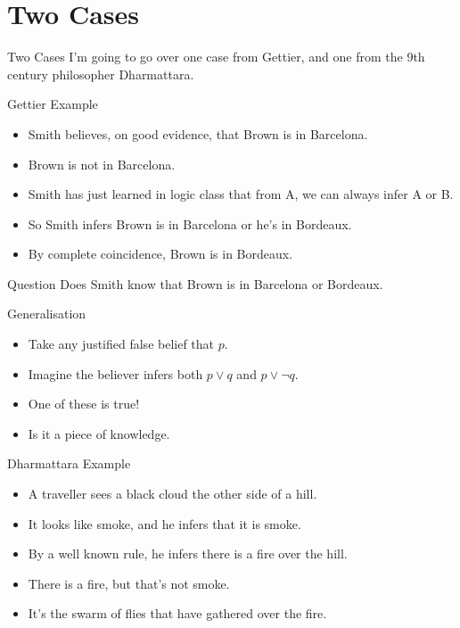 \documentclass[
  17pt,
  letterpaper,
  ignorenonframetext,
  aspectratio=169,
]{beamer}
\providecommand{\tightlist}{%
  \setlength{\itemsep}{0pt}\setlength{\parskip}{0pt}}\usepackage{longtable,booktabs,array}
\begin{document}
\hypertarget{two-cases}{%
\section{Two Cases}\label{two-cases}}

\begin{frame}{Two Cases}
\protect\hypertarget{two-cases-1}{}
I'm going to go over one case from Gettier, and one from the 9th century
philosopher Dharmattara.
\end{frame}

\begin{frame}{Gettier Example}
\protect\hypertarget{gettier-example}{}
\begin{itemize}[<+->]
\tightlist
\item
  Smith believes, on good evidence, that Brown is in Barcelona.
\item
  Brown is not in Barcelona.
\item
  Smith has just learned in logic class that from A, we can always infer
  A or B.
\item
  So Smith infers Brown is in Barcelona or he's in Bordeaux.
\item
  By complete coincidence, Brown is in Bordeaux.
\end{itemize}
\end{frame}

\begin{frame}{Question}
\protect\hypertarget{question}{}
Does Smith know that Brown is in Barcelona or Bordeaux.
\end{frame}

\begin{frame}{Generalisation}
\protect\hypertarget{generalisation}{}
\begin{itemize}[<+->]
\tightlist
\item
  Take any justified false belief that \(p\).
\item
  Imagine the believer infers both \(p \vee q\) and \(p \vee \neg q\).
\item
  One of these is true!
\item
  Is it a piece of knowledge.
\end{itemize}
\end{frame}

\begin{frame}{Dharmattara Example}
\protect\hypertarget{dharmattara-example}{}
\begin{itemize}[<+->]
\tightlist
\item
  A traveller sees a black cloud the other side of a hill.
\item
  It looks like smoke, and he infers that it is smoke.
\item
  By a well known rule, he infers there is a fire over the hill.
\item
  There is a fire, but that's not smoke.
\item
  It's the swarm of flies that have gathered over the fire.
\end{itemize}
\end{frame}
\end{document}
